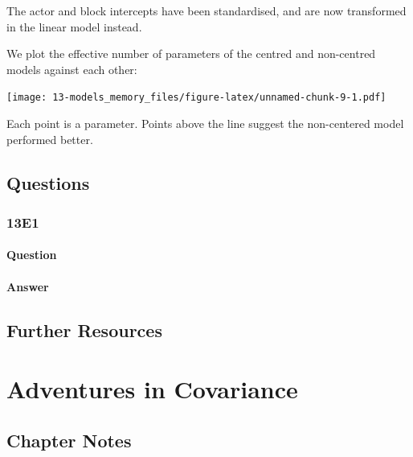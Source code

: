 \documentclass[
]{book}
\begin{document}
The actor and block intercepts have been standardised, and are now transformed in the linear model instead.

We plot the effective number of parameters of the centred and non-centred models against each other:

\texttt{[image: 13-models\_memory\_files/figure-latex/unnamed-chunk-9-1.pdf]}

Each point is a parameter. Points above the line suggest the non-centered model performed better.

\hypertarget{questions-12}{%
\section{Questions}\label{questions-12}}

\hypertarget{e1-10}{%
\subsection*{13E1}\label{e1-10}}

\hypertarget{question-99}{%
\subsubsection*{Question}\label{question-99}}

\hypertarget{answer-99}{%
\subsubsection*{Answer}\label{answer-99}}

\hypertarget{further-resources-3}{%
\section*{Further Resources}\label{further-resources-3}}

\hypertarget{covariance}{%
\chapter{Adventures in Covariance}\label{covariance}}

\hypertarget{chapter-notes-13}{%
\section{Chapter Notes}\label{chapter-notes-13}}
\end{document}
